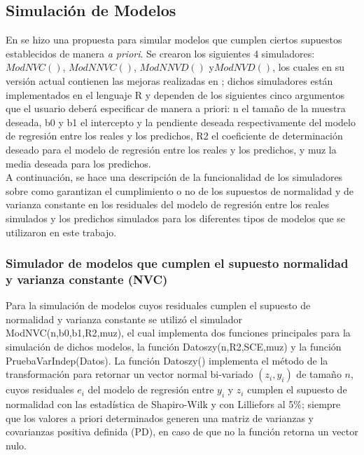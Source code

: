 \subsection{Simulación de Modelos}

En \textcite{febles-2014} se hizo una propuesta para simular modelos que cumplen ciertos supuestos establecidos de manera \textit{a priori}. Se crearon los siguientes 4 simuladores: $ModNVC()$, $ModNNVC()$, $ModNNVD()$ y$ ModNVD()$, los cuales en su versión actual contienen las mejoras realizadas en \textcite{zacarias-2023}; dichos simuladores están implementados en el lenguaje R y dependen de los siguientes cinco argumentos que el usuario deberá especificar de manera a priori: n el tamaño de la muestra deseada, b0 y b1 el intercepto y la pendiente deseada respectivamente del modelo de regresión entre los reales y los predichos, R2 el coeficiente de determinación deseado para el modelo de regresión entre los reales y los predichos, y muz la media deseada para los predichos. \\

A continuación, se hace una descripción de la funcionalidad de los simuladores sobre como garantizan el cumplimiento o no de los supuestos de normalidad y de varianza constante en los residuales del modelo de regresión entre los reales simulados y los predichos simulados para los diferentes tipos de modelos que se utilizaron en este trabajo.\\





\subsubsection{Simulador de modelos que cumplen el supuesto normalidad y varianza constante (NVC)}

Para la simulación de modelos cuyos residuales cumplen el supuesto de normalidad y varianza constante se utilizó el simulador ModNVC(n,b0,b1,R2,muz), el cual implementa dos funciones principales para la simulación de dichos modelos, la función Datoszy(n,R2,SCE,muz) y la función PruebaVarIndep(Datos). La función Datoszy() implementa el método de la transformación para retornar un vector normal bi-variado $(z_i,y_i)$ de tamaño $n$, cuyos residuales $e_i$ del  modelo de regresión  entre $y_i$ y $z_i$ cumplen el supuesto de normalidad con las estadística de Shapiro-Wilk y con Lilliefors al 5\%; siempre que los valores a priori determinados generen una matriz de varianzas y covarianzas positiva definida (PD), en caso de que no la función retorna un vector nulo.\\


